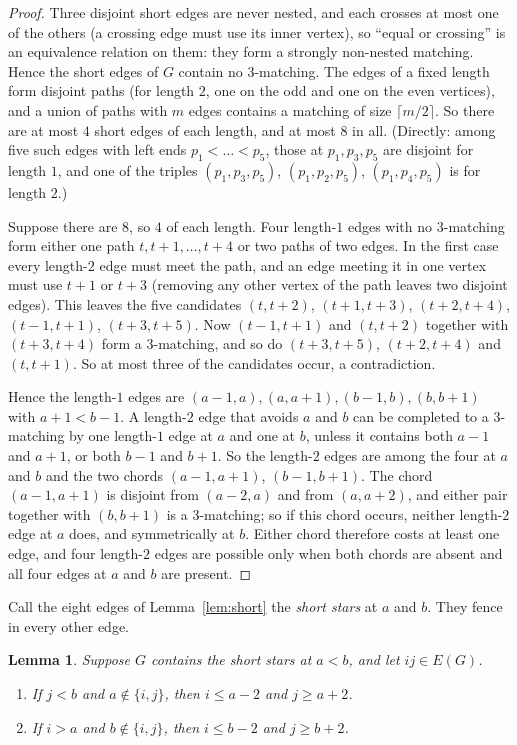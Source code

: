 \documentclass[11pt]{amsart}
\newtheorem{lemma}[theorem]{Lemma}
\theoremstyle{definition}\newtheorem{problem}{Problem}
\theoremstyle{remark}\newtheorem*{remark}{Remark}
\begin{document}
\begin{proof}
Three disjoint short edges are never nested, and each crosses at most one of the others (a crossing edge must use its
inner vertex), so ``equal or crossing'' is an equivalence relation on them: they form a strongly non-nested
matching. Hence the
short edges of $G$ contain no $3$-matching. The edges of a fixed length form disjoint paths (for length $2$, one on
the odd and one on the even vertices), and a union of paths with $m$ edges contains a matching of size $\lceil
m/2\rceil$. So there are at most $4$ short edges of each length, and at most $8$ in all. (Directly: among five such edges with
left ends $p_1<\dots<p_5$, those at $p_1,p_3,p_5$ are disjoint for length $1$, and one of the triples
$(p_1,p_3,p_5)$, $(p_1,p_2,p_5)$, $(p_1,p_4,p_5)$ is for length $2$.)

Suppose there are $8$, so $4$ of each length. Four length-$1$ edges with no $3$-matching form either one path
$t,t+1,\dots,t+4$ or two paths of two edges. In the first case every length-$2$ edge must meet the path, and an edge
meeting it in one vertex must use $t+1$ or $t+3$ (removing any other vertex of the path leaves two disjoint edges). This
leaves the five candidates $(t,t+2)$, $(t+1,t+3)$, $(t+2,t+4)$, $(t-1,t+1)$, $(t+3,t+5)$. Now $(t-1,t+1)$ and $(t,t+2)$
together with $(t+3,t+4)$ form a $3$-matching, and so do $(t+3,t+5)$, $(t+2,t+4)$ and $(t,t+1)$. So at most three of
the candidates occur, a contradiction.

Hence the length-$1$ edges are $(a-1,a),(a,a+1),(b-1,b),(b,b+1)$ with $a+1<b-1$. A length-$2$ edge that avoids $a$ and
$b$ can be completed to a $3$-matching by one length-$1$ edge at $a$ and one at $b$, unless it contains both
$a-1$ and $a+1$, or both $b-1$ and $b+1$. So the length-$2$ edges are among the four at $a$ and $b$ and the two chords
$(a-1,a+1)$, $(b-1,b+1)$. The chord $(a-1,a+1)$ is disjoint from $(a-2,a)$ and from $(a,a+2)$, and either pair together
with $(b,b+1)$ is a $3$-matching; so if this chord occurs, neither length-$2$ edge at $a$ does, and symmetrically at
$b$. Either chord therefore costs at least one edge, and four length-$2$ edges are possible only when both chords are
absent and all four edges at $a$ and $b$ are present.
\end{proof}

Call the eight edges of Lemma~\ref{lem:short} the \emph{short stars} at $a$ and $b$. They fence in every other edge.

\begin{lemma}\label{lem:fence}
Suppose $G$ contains the short stars at $a<b$, and let $ij\in E(G)$.
\begin{enumerate}
\item[(L)] If $j<b$ and $a\notin\{i,j\}$, then $i\le a-2$ and $j\ge a+2$.
\item[(R)] If $i>a$ and $b\notin\{i,j\}$, then $i\le b-2$ and $j\ge b+2$.
\end{enumerate}
\end{lemma}
\end{document}
